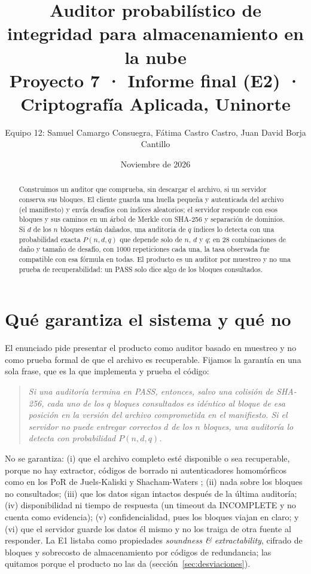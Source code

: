 \documentclass[11pt,a4paper]{article}
\title{\textbf{Auditor probabilístico de integridad para almacenamiento en la nube}\\[2pt]
\large Proyecto 7 · Informe final (E2) · Criptografía Aplicada, Uninorte}
\author{Equipo 12: Samuel Camargo Consuegra, Fátima Castro Castro, Juan David Borja Cantillo}
\date{Noviembre de 2026}
\begin{document}
\maketitle

\begin{abstract}
Construimos un auditor que comprueba, sin descargar el archivo, si un servidor conserva sus bloques.
El cliente guarda una huella pequeña y autenticada del archivo (el manifiesto) y envía desafíos con
índices aleatorios; el servidor responde con esos bloques y sus caminos en un árbol de Merkle con
SHA-256 y separación de dominios. Si $d$ de los $n$ bloques están dañados, una auditoría de $q$
índices lo detecta con una probabilidad exacta $P(n,d,q)$ que depende solo de $n$, $d$ y $q$; en 28
combinaciones de daño y tamaño de desafío, con 1000 repeticiones cada una, la tasa observada fue
compatible con esa fórmula en todas. El producto es un auditor por muestreo y no una prueba de
recuperabilidad: un PASS solo dice algo de los bloques consultados.
\end{abstract}

\section{Qué garantiza el sistema y qué no}
\label{sec:garantia}

El enunciado pide presentar el producto como auditor basado en muestreo y no como prueba formal de
que el archivo es recuperable. Fijamos la garantía en una sola frase, que es la que implementa y
prueba el código:

\begin{quote}
\emph{Si una auditoría termina en PASS, entonces, salvo una colisión de SHA-256, cada uno de los $q$
bloques consultados es idéntico al bloque de esa posición en la versión del archivo comprometida en
el manifiesto. Si el servidor no puede entregar correctos $d$ de los $n$ bloques, una auditoría lo
detecta con probabilidad $P(n,d,q)$.}
\end{quote}

\noindent No se garantiza: (i) que el archivo completo esté disponible o sea recuperable, porque no
hay extractor, códigos de borrado ni autenticadores homomórficos como en los PoR de Juels-Kaliski
\cite{jk07} y Shacham-Waters \cite{sw08}; (ii) nada sobre los bloques no consultados; (iii) que los
datos sigan intactos después de la última auditoría; (iv) disponibilidad ni tiempo de respuesta
(un timeout da INCOMPLETE y no cuenta como evidencia); (v) confidencialidad, pues los bloques viajan
en claro; y (vi) que el servidor guarde los datos él mismo y no los traiga de otra fuente al
responder. La E1 listaba como propiedades \emph{soundness \& extractability}, cifrado de bloques y
sobrecosto de almacenamiento por códigos de redundancia; las quitamos porque el producto no las da
(sección~\ref{sec:desviaciones}).
\end{document}
